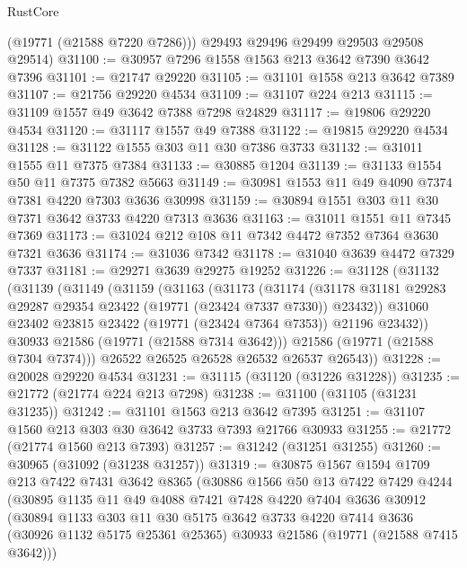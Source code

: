 \begin{lexlean}{RustCore}
\begin{coremodule}
        (@19771 (@21588 @7220 @7286)))
      @29493
      @29496
      @29499
      @29503
      @29508
      @29514)
@31100 := @30957 @7296 @1558 @1563 @213 @3642 @7390 @3642 @7396
@31101 := @21747 @29220
@31105 := @31101 @1558 @213 @3642 @7389
@31107 := @21756 @29220 @4534
@31109 := @31107 @224 @213
@31115 := @31109 @1557 @49 @3642 @7388 @7298 @24829
@31117 := @19806 @29220 @4534
@31120 := @31117 @1557 @49 @7388
@31122 := @19815 @29220 @4534
@31128 := @31122 @1555 @303 @11 @30 @7386 @3733
@31132 := @31011 @1555 @11 @7375 @7384
@31133 := @30885 @1204
@31139 := @31133 @1554 @50 @11 @7375 @7382 @5663
@31149 := @30981 @1553 @11 @49 @4090 @7374 @7381 @4220 @7303 @3636 @30998
@31159 := @30894 @1551 @303 @11 @30 @7371 @3642 @3733 @4220 @7313 @3636
@31163 := @31011 @1551 @11 @7345 @7369
@31173 := @31024 @212 @108 @11 @7342 @4472 @7352 @7364 @3630 @7321 @3636
@31174 := @31036 @7342
@31178 := @31040 @3639 @4472 @7329 @7337
@31181 := @29271 @3639 @29275 @19252
@31226 := @31128
    (@31132
      (@31139
        (@31149
          (@31159
            (@31163
              (@31173
                (@31174
                  (@31178 @31181 @29283 @29287 @29354 @23422 (@19771 (@23424 @7337 @7330)) @23432))
                @31060
                @23402
                @23815
                @23422
                (@19771 (@23424 @7364 @7353))
                @21196
                @23432))
            @30933
            @21586
            (@19771 (@21588 @7314 @3642)))
          @21586
          (@19771 (@21588 @7304 @7374)))
        @26522
        @26525
        @26528
        @26532
        @26537
        @26543))
@31228 := @20028 @29220 @4534
@31231 := @31115 (@31120 (@31226 @31228))
@31235 := @21772 (@21774 @224 @213 @7298)
@31238 := @31100 (@31105 (@31231 @31235))
@31242 := @31101 @1563 @213 @3642 @7395
@31251 := @31107 @1560 @213 @303 @30 @3642 @3733 @7393 @21766 @30933
@31255 := @21772 (@21774 @1560 @213 @7393)
@31257 := @31242 (@31251 @31255)
@31260 := @30965 (@31092 (@31238 @31257))
@31319 := @30875
    @1567
    @1594
    @1709
    @213
    @7422
    @7431
    @3642
    @8365
    (@30886
      @1566
      @50
      @13
      @7422
      @7429
      @4244
      (@30895
        @1135
        @11
        @49
        @4088
        @7421
        @7428
        @4220
        @7404
        @3636
        @30912
        (@30894
          @1133
          @303
          @11
          @30
          @5175
          @3642
          @3733
          @4220
          @7414
          @3636
          (@30926 @1132 @5175 @25361 @25365)
          @30933
          @21586
          (@19771 (@21588 @7415 @3642)))

\end{coremodule}
\end{lexlean}
